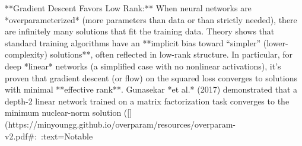 **Gradient Descent Favors Low Rank:** When neural networks are *overparameterized* (more parameters than data or than strictly needed), there are infinitely many solutions that fit the training data. Theory shows that standard training algorithms have an **implicit bias toward “simpler” (lower-complexity) solutions**, often reflected in low-rank structure. In particular, for deep *linear* networks (a simplified case with no nonlinear activations), it’s proven that gradient descent (or flow) on the squared loss converges to solutions with minimal **effective rank**. Gunasekar *et al.* (2017) demonstrated that a depth-2 linear network trained on a matrix factorization task converges to the minimum nuclear-norm solution ([](https://minyoungg.github.io/overparam/resources/overparam-v2.pdf#:~:text=Notable%

